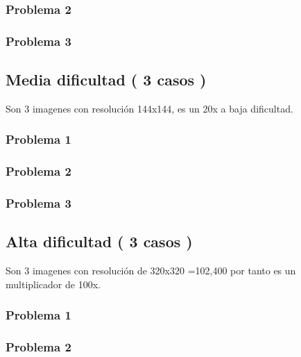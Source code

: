 \documentclass[
  spanish,
]{article}
\begin{document}
\hypertarget{problema-2}{%
\subsubsection{Problema 2}\label{problema-2}}

\hypertarget{problema-3}{%
\subsubsection{Problema 3}\label{problema-3}}

\hypertarget{media-dificultad-3-casos}{%
\subsection{Media dificultad ( 3 casos
)}\label{media-dificultad-3-casos}}

Son 3 imagenes con resolución 144x144, es un 20x a baja dificultad.

\hypertarget{problema-1-1}{%
\subsubsection{Problema 1}\label{problema-1-1}}

\hypertarget{problema-2-1}{%
\subsubsection{Problema 2}\label{problema-2-1}}

\hypertarget{problema-3-1}{%
\subsubsection{Problema 3}\label{problema-3-1}}

\hypertarget{alta-dificultad-3-casos}{%
\subsection{Alta dificultad ( 3 casos )}\label{alta-dificultad-3-casos}}

Son 3 imagenes con resolución de 320x320 =102,400 por tanto es un
multiplicador de 100x.

\hypertarget{problema-1-2}{%
\subsubsection{Problema 1}\label{problema-1-2}}

\hypertarget{problema-2-2}{%
\subsubsection{Problema 2}\label{problema-2-2}}
\end{document}
